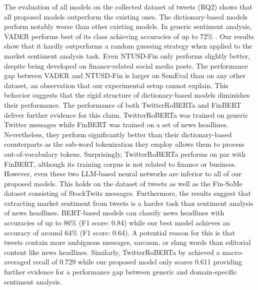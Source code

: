 The evaluation of all models on the collected dataset of tweets (RQ2) shows that all proposed models outperform the existing ones. The dictionary-based models perform notably worse than other existing models. In generic sentiment analysis, VADER performs best of its class achieving accuracies of up to 72\% . Our results show that it hardly outperforms a random guessing strategy when applied to the market sentiment analysis task. Even NTUSD-Fin only performs slightly better, despite being developed on finance-related social media posts. The performance gap between VADER and NTUSD-Fin is larger on SemEval than on any other dataset, an observation that our experimental setup cannot explain.
 This behavior suggests that the rigid structure of dictionary-based models diminishes their performance. The performance of both TwitterRoBERTa and FinBERT deliver further evidence for this claim. TwitterRoBERTa was trained on generic Twitter messages while FinBERT was trained on a set of news headlines. Nevertheless, they perform significantly better than their dictionary-based counterparts as the sub-word tokenization they employ allows them to process out-of-vocabulary tokens. Surprisingly, TwitterRoBERTa performs on par with FinBERT, although its training corpus is not related to finance or business. However, even these two LLM-based neural networks are inferior to all of our proposed models. This holds on the dataset of tweets as well as the Fin-SoMe dataset consisting of StockTwits messages.\newline
 Furthermore, the results suggest that extracting market sentiment from tweets is a harder task than sentiment analysis of news headlines. BERT-based models can classify news headlines with accuracies of up to 86\% (F1 score: 0.84)  while our best model achieves an accuracy of around 64\% (F1 score: 0.64). A potential reason for this is that tweets contain more ambiguous messages, sarcasm, or slang words than editorial content like news headlines. Similarly, TwitterRoBERTa by  achieved a macro-averaged recall of 0.729 while our proposed model only scores 0.611 providing further evidence for a performance gap between generic and domain-specific sentiment analysis.


